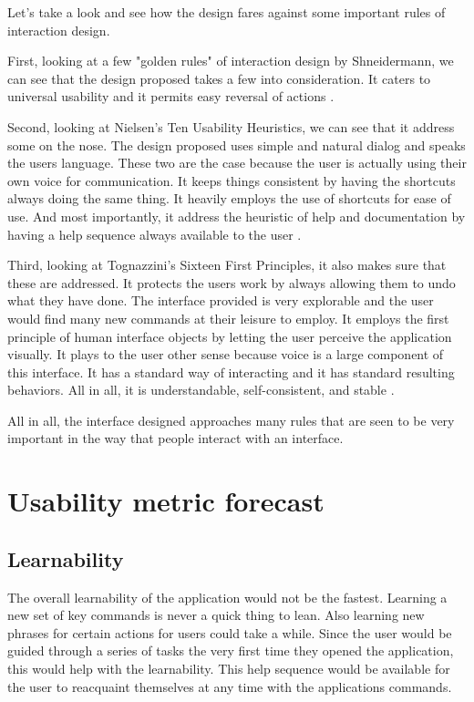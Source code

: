 \documentclass[11pt, oneside]{article}
\begin{document}
Let's take a look and see how the design fares against some important rules of interaction design.

First, looking at a few "golden rules" of interaction design by Shneidermann, we can see that the design proposed takes a few into consideration. It caters to universal usability and it permits easy reversal of actions \cite{shniederman-golden-rules}.

Second, looking at Nielsen's Ten Usability Heuristics, we can see that it address some on the nose. The design proposed uses simple and natural dialog and speaks the users language. These two are the case because the user is actually using their own voice for communication. It keeps things consistent by having the shortcuts always doing the same thing. It heavily employs the use of shortcuts for ease of use. And most importantly, it address the heuristic of help and documentation by having a help sequence always available to the user \cite{nielsen-usability-heuristics}.

Third, looking at Tognazzini's Sixteen First Principles, it also makes sure that these are addressed. It protects the users work by always allowing them to undo what they have done. The interface provided is very explorable and the user would find many new commands at their leisure to employ. It employs the first principle of human interface objects by letting the user perceive the application visually. It plays to the user other sense because voice is a large component of this interface. It has a standard way of interacting and it has standard resulting behaviors. All in all, it is understandable, self-consistent, and stable \cite{tognazzini-first-principles}.

All in all, the interface designed approaches many rules that are seen to be very important in the way that people interact with an interface.


\section{Usability metric forecast}

\subsection{Learnability}
The overall learnability of the application would not be the fastest. Learning a new set of key commands is never a quick thing to lean. Also learning new phrases for certain actions for users could take a while. Since the user would be guided through a series of tasks the very first time they opened the application, this would help with the learnability. This help sequence would be available for the user to reacquaint themselves at any time with the applications commands.
\end{document}
